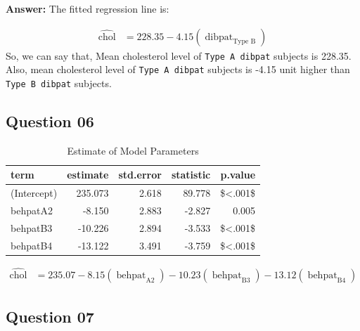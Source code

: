 \documentclass[
  12pt,
  oneside]{article}
\begin{document}
\textbf{Answer:} The fitted regression line is:

\begin{equation}
\begin{aligned}
\operatorname{\widehat{chol}} &= 228.35 - 4.15(\operatorname{dibpat}_{\operatorname{Type\ B}})
\end{aligned}
\end{equation}
So, we can say that, Mean cholesterol level of \texttt{Type\ A\ dibpat} subjects is 228.35. Also, mean cholesterol level of \texttt{Type\ A\ dibpat} subjects is -4.15 unit higher than \texttt{Type\ B\ dibpat} subjects.

\hypertarget{question-06}{%
\subsection{Question 06}\label{question-06}}

\begin{table}[H]

\caption{\label{tab:Table-08}Estimate of Model Parameters}
\centering
\begin{tabular}[t]{lrrrr}
\toprule
term & estimate & std.error & statistic & p.value\\
\midrule
(Intercept) & 235.073 & 2.618 & 89.778 & \$<.001\$\\
behpatA2 & -8.150 & 2.883 & -2.827 & 0.005\\
behpatB3 & -10.226 & 2.894 & -3.533 & \$<.001\$\\
behpatB4 & -13.122 & 3.491 & -3.759 & \$<.001\$\\
\bottomrule
\end{tabular}
\end{table}

\begin{equation}
\begin{aligned}
\operatorname{\widehat{chol}} &= 235.07 - 8.15(\operatorname{behpat}_{\operatorname{A2}}) - 10.23(\operatorname{behpat}_{\operatorname{B3}}) - 13.12(\operatorname{behpat}_{\operatorname{B4}})
\end{aligned}
\end{equation}

\hypertarget{question-07}{%
\subsection{Question 07}\label{question-07}}
\end{document}
